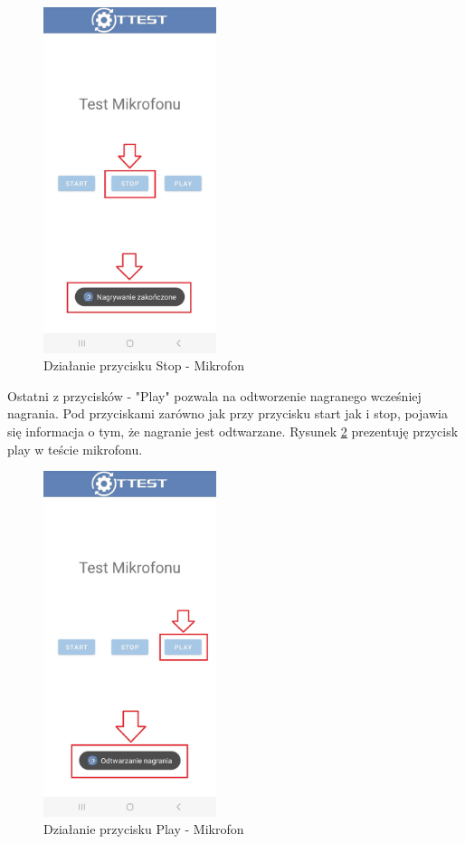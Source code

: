 \begin{figure}[!hbt]
	\begin{center}
		\includegraphics[angle=360, width=0.45\textwidth]{rys/punkt6/mikrofon2}
		\caption{Działanie przycisku Stop - Mikrofon}
		\label{rys:mikrofon2}
	\end{center}
\end{figure}

\newpage


Ostatni z przycisków - "Play" pozwala na odtworzenie nagranego wcześniej nagrania. Pod przyciskami zarówno jak przy przycisku start jak i stop, pojawia się informacja o tym, że nagranie jest odtwarzane. Rysunek \ref{rys:mikrofon3} prezentuję przycisk play w teście mikrofonu.

\begin{figure}[!hbt]
	\begin{center}
		\includegraphics[angle=360, width=0.45\textwidth]{rys/punkt6/mikrofon3}
		\caption{Działanie przycisku Play - Mikrofon}
		\label{rys:mikrofon3}
	\end{center}
\end{figure}

